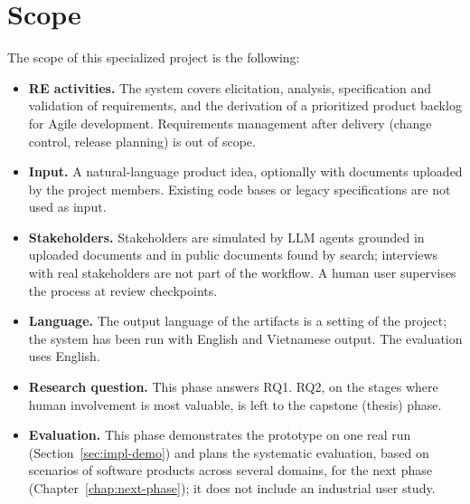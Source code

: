\section{Scope}
\label{sec:scope}

The scope of this specialized project is the following:
\begin{itemize}
    \item \textbf{RE activities.} The system covers elicitation, analysis, specification and validation of requirements, and the derivation of a prioritized product backlog for Agile development. Requirements management after delivery (change control, release planning) is out of scope.
    \item \textbf{Input.} A natural-language product idea, optionally with documents uploaded by the project members. Existing code bases or legacy specifications are not used as input.
    \item \textbf{Stakeholders.} Stakeholders are simulated by LLM agents grounded in uploaded documents and in public documents found by search; interviews with real stakeholders are not part of the workflow. A human user supervises the process at review checkpoints.
    \item \textbf{Language.} The output language of the artifacts is a setting of the project; the system has been run with English and Vietnamese output. The evaluation uses English.
    \item \textbf{Research question.} This phase answers RQ1. RQ2, on the stages where human involvement is most valuable, is left to the capstone (thesis) phase.
    \item \textbf{Evaluation.} This phase demonstrates the prototype on one real run (Section~\ref{sec:impl-demo}) and plans the systematic evaluation, based on scenarios of software products across several domains, for the next phase (Chapter~\ref{chap:next-phase}); it does not include an industrial user study.
\end{itemize}
